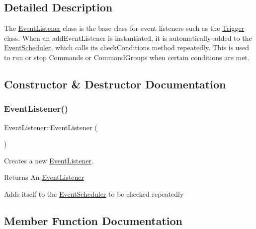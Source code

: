 \subsection{Detailed Description}
The \mbox{\hyperlink{classlib_iterative_robot_1_1_event_listener}{Event\+Listener}} class is the base class for event listeners such as the \mbox{\hyperlink{classlib_iterative_robot_1_1_trigger}{Trigger}} class. When an add\+Event\+Listener is instantiated, it is automatically added to the \mbox{\hyperlink{classlib_iterative_robot_1_1_event_scheduler}{Event\+Scheduler}}, which calls its check\+Conditions method repeatedly. This is used to run or stop Commands or Command\+Groups when certain conditions are met. 

\subsection{Constructor \& Destructor Documentation}
\mbox{\label{classlib_iterative_robot_1_1_event_listener_ac8cfe1097cbec18fac9313feccdb0e20}} 
\subsubsection{\texorpdfstring{EventListener()}{EventListener()}}
{\footnotesize\ttfamily Event\+Listener\+::\+Event\+Listener (\begin{DoxyParamCaption}{ }\end{DoxyParamCaption})\hspace{0.3cm}{\ttfamily [protected]}}



Creates a new \mbox{\hyperlink{classlib_iterative_robot_1_1_event_listener}{Event\+Listener}}. 

\begin{DoxyReturn}{Returns}
An \mbox{\hyperlink{classlib_iterative_robot_1_1_event_listener}{Event\+Listener}}
\end{DoxyReturn}
Adds itself to the \mbox{\hyperlink{classlib_iterative_robot_1_1_event_scheduler}{Event\+Scheduler}} to be checked repeatedly

 

\subsection{Member Function Documentation}
\mbox{\label{classlib_iterative_robot_1_1_event_listener_aacbdd1cd66bf22e081add72b127af3a1}} 
